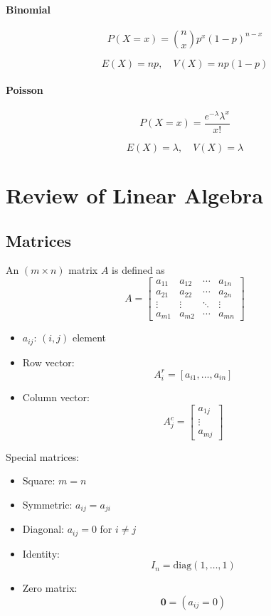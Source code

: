 \paragraph{Binomial}
\[
P(X=x) = \binom{n}{x} p^x (1-p)^{n-x}
\]

\[
E(X)=np, \quad V(X)=np(1-p)
\]

\paragraph{Poisson}
\[
P(X=x) = \frac{e^{-\lambda}\lambda^x}{x!}
\]

\[
E(X)=\lambda, \quad V(X)=\lambda
\]



\newpage

\section{Review of Linear Algebra}

\subsection{Matrices}

An $(m \times n)$ matrix $A$ is defined as
\[
A =
\begin{bmatrix}
a_{11} & a_{12} & \cdots & a_{1n} \\
a_{21} & a_{22} & \cdots & a_{2n} \\
\vdots & \vdots & \ddots & \vdots \\
a_{m1} & a_{m2} & \cdots & a_{mn}
\end{bmatrix}
\]

\begin{itemize}
    \item $a_{ij}$: $(i,j)$ element
    \item Row vector:
    \[
    A_i^r = [a_{i1}, \dots, a_{in}]
    \]
    \item Column vector:
    \[
    A_j^c =
    \begin{bmatrix}
    a_{1j} \\
    \vdots \\
    a_{mj}
    \end{bmatrix}
    \]
\end{itemize}

Special matrices:
\begin{itemize}
    \item Square: $m=n$
    \item Symmetric: $a_{ij}=a_{ji}$
    \item Diagonal: $a_{ij}=0$ for $i\neq j$
    \item Identity:
    \[
    I_n = \text{diag}(1,\dots,1)
    \]
    \item Zero matrix:
    \[
    \mathbf{0} = (a_{ij}=0)
    \]
\end{itemize}

